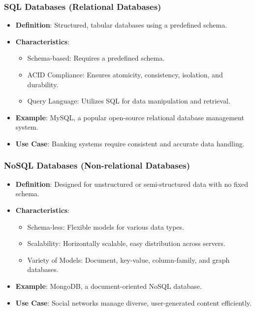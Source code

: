 \documentclass[aspectratio=169]{beamer}
\begin{document}
\begin{frame}[fragile]
    \frametitle{SQL Databases (Relational Databases)}
    \begin{itemize}
        \item \textbf{Definition}: Structured, tabular databases using a predefined schema.
        \item \textbf{Characteristics}:
        \begin{itemize}
            \item Schema-based: Requires a predefined schema.
            \item ACID Compliance: Ensures atomicity, consistency, isolation, and durability.
            \item Query Language: Utilizes SQL for data manipulation and retrieval.
        \end{itemize}
        \item \textbf{Example}: MySQL, a popular open-source relational database management system.
        \item \textbf{Use Case}: Banking systems require consistent and accurate data handling.
    \end{itemize}
\end{frame}

\begin{frame}[fragile]
    \frametitle{NoSQL Databases (Non-relational Databases)}
    \begin{itemize}
        \item \textbf{Definition}: Designed for unstructured or semi-structured data with no fixed schema.
        \item \textbf{Characteristics}:
        \begin{itemize}
            \item Schema-less: Flexible models for various data types.
            \item Scalability: Horizontally scalable, easy distribution across servers.
            \item Variety of Models: Document, key-value, column-family, and graph databases.
        \end{itemize}
        \item \textbf{Example}: MongoDB, a document-oriented NoSQL database.
        \item \textbf{Use Case}: Social networks manage diverse, user-generated content efficiently.
    \end{itemize}
\end{frame}
\end{document}
